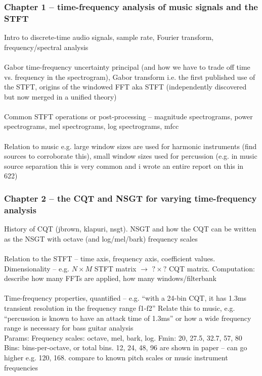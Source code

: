 \documentclass[usenames,dvipsnames]{beamer}
\begin{document}
\begin{frame}
	\frametitle{Chapter 1 -- time-frequency analysis of music signals and the STFT}
	Intro to discrete-time audio signals, sample rate, Fourier transform, frequency/spectral analysis\\\ \\
	Gabor time-frequency uncertainty principal (and how we have to trade off time vs. frequency in the spectrogram), Gabor transform i.e. the first published use of the STFT, origins of the windowed FFT aka STFT (independently discovered but now merged in a unified theory)\\\ \\
	Common STFT operations or post-processing -- magnitude spectrograms, power spectrograms, mel spectrograms, log spectrograms, mfcc\\\ \\
	Relation to music e.g. large window sizes are used for harmonic instruments (find sources to corroborate this), small window sizes used for percussion (e.g. in music source separation this is very common and i wrote an entire report on this in 622)
\end{frame}

\begin{frame}
	\frametitle{Chapter 2 -- the CQT and NSGT for varying time-frequency analysis}
	History of CQT (jbrown, klapuri, nsgt). NSGT and how the CQT can be written as the NSGT with octave (and log/mel/bark) frequency scales\\\ \\
	Relation to the STFT -- time axis, frequency axis, coefficient values. Dimensionality -- e.g. $N \times M$  STFT matrix $\rightarrow$ $? \times ?$ CQT matrix. Computation: describe how many FFTs are applied, how many windows/filterbank\\\ \\
	Time-frequency properties, quantified -- e.g. ``with a 24-bin CQT, it has 1.3ms transient resolution in the frequency range f1-f2'' Relate this to music, e.g. ``percussion is known to have an attack time of 1.3ms'' or how a wide frequency range is necessary for bass guitar analysis\\
Params: Frequency scales: octave, mel, bark, log. Fmin: 20, 27.5, 32.7, 57, 80 Bins: bins-per-octave, or total bins. 12, 24, 48, 96 are shown in paper -- can go higher e.g. 120, 168. compare to known pitch scales or music instrument frequencies
\end{frame}
\end{document}
